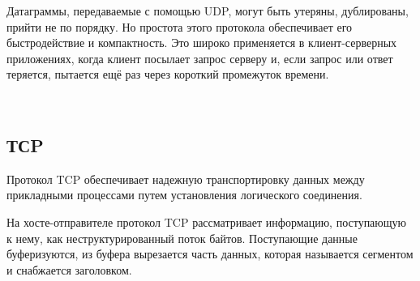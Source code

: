 \documentclass{article}
\begin{document}
Датаграммы, передаваемые с помощью UDP, могут быть утеряны, дублированы, прийти не по порядку. Но простота этого протокола обеспечивает его быстродействие и компактность.
Это широко применяется в клиент-серверных приложениях, когда клиент посылает запрос серверу и, если запрос или ответ теряется, пытается ещё раз через короткий промежуток времени.

~\

\newpage

\subsection{\textbf{ТСP}}

Протокол TCP обеспечивает надежную транспортировку данных между прикладными процессами путем установления логического соединения. 

На хосте-отправителе протокол TCP рассматривает информацию, поступающую к нему, как неструктурированный поток байтов. Поступающие данные буферизуются, из буфера вырезается часть данных, которая называется сегментом и снабжается заголовком.

~\

\begin{figure}[h]
\end{figure}
\end{document}
